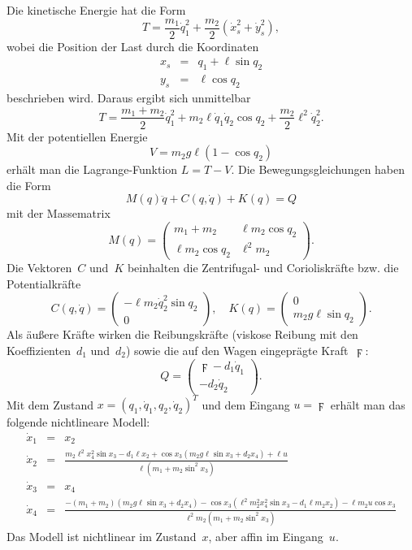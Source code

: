 Die kinetische Energie hat die Form
\[
T=\frac{m_{1}}{2}\dot{q}_{1}^{2}+\frac{m_{2}}{2}\left(\dot{x}_{s}^{2}+\dot{y}_{s}^{2}\right),
\]
wobei die Position der Last durch die Koordinaten 
\begin{eqnarray*}
x_{s} & = & q_{1}+\ell\sin q_{2}\\
y_{s} & = & \ell\cos q_{2}
\end{eqnarray*}
beschrieben wird. Daraus ergibt sich unmittelbar 
\[
T=\frac{m_{1}+m_{2}}{2}\dot{q}_{1}^{2}+m_{2}\ell\dot{q}_{1}\dot{q}_{2}\cos q_{2}+\frac{m_{2}}{2}\ell^{2}\dot{q}_{2}^{2}.
\]
Mit der potentiellen Energie 
\[
V=m_{2}g\ell(1-\cos q_{2})
\]
erhält man die Lagrange-Funktion $L=T-V$. Die Bewegungsgleichungen
haben die Form
\[
M(q)\ddot{q}+C(q,\dot{q})+K(q)=Q
\]
mit der Massematrix 
\[
M(q)=\left(\begin{array}{cc}
m_{1}+m_{2} & \ell m_{2}\cos q_{2}\\
\ell m_{2}\cos q_{2} & \ell^{2}m_{2}
\end{array}\right).
\]
Die Vektoren~$C$ und~$K$ beinhalten die Zentrifugal- und Corioliskräfte
bzw. die Potentialkräfte 
\[
C(q,\dot{q})=\left(\begin{array}{c}
-\ell m_{2}\dot{q}_{2}^{2}\sin q_{2}\\
\text{0}
\end{array}\right),\quad K(q)=\left(\begin{array}{c}
0\\
m_{2}g\ell\sin q_{2}
\end{array}\right).
\]
Als äußere Kräfte wirken die Reibungskräfte (viskose Reibung mit den
Koeffizienten~$d_{1}$ und~$d_{2}$) sowie die auf den Wagen eingeprägte
Kraft~$\digamma$:
\[
Q=\left(\begin{array}{c}
\digamma-d_{1}\dot{q}_{1}\\
-d_{2}\dot{q}_{2}
\end{array}\right).
\]
Mit dem Zustand $x=(q_{1},\dot{q}_{1},q_{2},\dot{q}_{2})^{T}$ und
dem Eingang $u=\digamma$ erhält man das folgende nichtlineare Modell:
\begin{equation}
\begin{array}{lcl}
\dot{x}_{1} & = & x_{2}\\
\dot{x}_{2} & = & \frac{m_{2}\ell^{2}x_{4}^{2}\sin x_{3}-d_{1}\ell x_{2}+\cos x_{3}\left(m_{2}g\ell\sin x_{3}+d_{2}x_{4}\right)+\ell u}{\ell\left(m_{1}+m_{2}\sin^{2}x_{3}\right)}\\
\dot{x}_{3} & = & x_{4}\\
\dot{x}_{4} & = & \frac{-\left(m_{1}+m_{2}\right)\left(m_{2}g\ell\sin x_{3}+d_{2}x_{4}\right)-\cos x_{3}\left(\ell^{2}m_{2}^{2}x_{4}^{2}\sin x_{3}-d_{1}\ell m_{2}x_{2}\right)-\ell m_{2}u\cos x_{3}}{\ell^{2}m_{2}\left(m_{1}+m_{2}\sin^{2}x_{3}\right)}
\end{array}\label{eq:modell-pendel-mit-wagen}
\end{equation}
Das Modell ist nichtlinear im Zustand~$x$, aber affin im Eingang~$u$.

